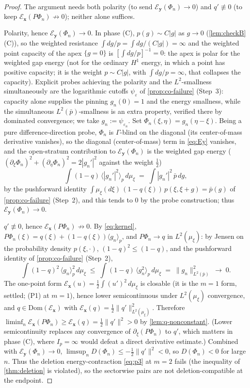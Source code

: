 \documentclass[reqno,final,11pt]{amsart}
\theoremstyle{plain}
\theoremstyle{definition}
\theoremstyle{remark}
\newcommand{\Dom}{\mathrm{Dom}}
\newcommand{\cE}{\mathcal E}
\begin{document}
\begin{proof}
The argument needs both polarity (to send $\cE_{\mathbf y}(\Phi_n)\to0$)
and $q'\not\equiv0$ (to keep $\cE_{\mathbf x}(P\Phi_n)\not\to0$); neither alone
suffices.

Polarity, hence $\cE_{\mathbf y}(\Phi_n)\to0$. In phase \textnormal{(C)},
$p(g)\sim C|g|$ as $g\to0$ (\cref{lem:checkB}(C)), so the weighted resistance
$\int dg/p=\int dg/(C|g|)=\infty$ and the weighted point capacity of the apex
$\{g=0\}$ is $[\int dg/p]^{-1}=0$: the apex is polar for the weighted gap
energy (not for the ordinary $H^1$ energy, in which a point has positive
capacity; it is the weight $p\sim C|g|$, with $\int dg/p=\infty$, that
collapses the capacity). Explicit probes achieving the polarity and the
$L^2$-smallness simultaneously are the logarithmic cutoffs
$\psi_\varepsilon$ of \cref{prop:co-failure} (Step~3): capacity alone supplies
the pinning $g_n(0)=1$ and the energy smallness, while the simultaneous
$L^2(\bar p)$-smallness is an extra property, verified there by dominated
convergence; we take $g_n:=\psi_{\varepsilon_n}$. Set
$\Phi_n(\xi,\eta)=g_n(\eta-\xi)$. Being a pure difference-direction probe,
$\Phi_n$ is $\Gamma$-blind on the diagonal (its center-of-mass derivative
vanishes), so the diagonal (center-of-mass) term in \eqref{eq:Ey} vanishes, and
the open-stratum contribution to $\cE_{\mathbf y}(\Phi_n)$ is the weighted gap
energy ($(\partial_\xi\Phi_n)^2+(\partial_\eta\Phi_n)^2=2|g_n'|^2$ against the
weight $\tfrac12$)
\[
  \int(1-q)\,\bigl\langle|g_n'|^2\bigr\rangle_p\,d\mu_\xi
  \;=\;\int|g_n'|^2\,\bar p\,dg ,
\]
by the pushforward identity
$\int\mu_\xi(d\xi)\,(1-q(\xi))\,p(\xi,\xi+g)=\bar p(g)$ of
\cref{prop:co-failure} (Step~2), and this tends to $0$ by the probe
construction; thus $\cE_{\mathbf y}(\Phi_n)\to0$.

$q'\not\equiv0$, hence $\cE_{\mathbf x}(P\Phi_n)\not\to0$. By
\eqref{eq:kernel}, $P\Phi_n(\xi)=q(\xi)+(1-q(\xi))\langle g_n\rangle_p$, and
$P\Phi_n\to q$ in $L^2(\mu_\xi)$: by Jensen on the probability density
$p(\xi,\cdot)$, $(1-q)^2\le(1-q)$, and the pushforward identity of
\cref{prop:co-failure} (Step~2),
\[
  \int(1-q)^2\,\langle g_n\rangle_p^2\,d\mu_\xi
  \;\le\;\int(1-q)\,\langle g_n^2\rangle_p\,d\mu_\xi
  \;=\;\|g_n\|^2_{L^2(\bar p)}\;\longrightarrow\;0 .
\]
The
one-point form $\cE_{\mathbf x}(u)=\tfrac12\int(u')^2\,d\mu_\xi$ is closable (it is
the $m=1$ form, settled; (P1) at $m=1$), hence lower semicontinuous under
$L^2(\mu_\xi)$ convergence, and $q\in\Dom(\cE_{\mathbf x})$ with
$\cE_{\mathbf x}(q)=\tfrac12\|q'\|_{L^2(\mu_\xi)}^2$. Therefore
$\liminf_n\cE_{\mathbf x}(P\Phi_n)\ge\cE_{\mathbf x}(q)=\tfrac12\|q'\|^2>0$ by
\cref{lem:q-nonconstant}. (Lower semicontinuity replaces any convergence of
$\partial_\xi(P\Phi_n)$ to $q'$, which matters in phase (C), where
$I_p=\infty$ would defeat a direct derivative estimate.) Combined with
$\cE_{\mathbf y}(\Phi_n)\to0$, $\limsup_n D(\Phi_n)\le-\tfrac12\|q'\|^2<0$, so
$D(\Phi_n)<0$ for large $n$. Thus the deletion energy-contraction \eqref{eq:p3}
at $m=2$ fails (the inequality of \cref{thm:deletion} is violated), so the
sectorwise pairs are not deletion-compatible at the endpoint.
\end{proof}
\end{document}
